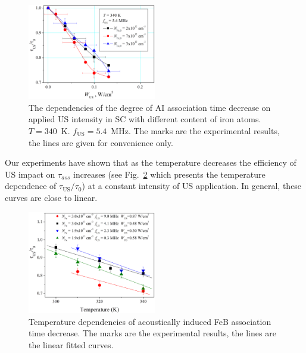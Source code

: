 \begin{figure}
 \includegraphics[width=0.5\textwidth]{Fig5}
\caption{
The dependencies of the degree of AI association time decrease on applied US intensity
in SC with different content of iron atoms.
$T=340$~K.
$f_\mathrm{US}=5.4$~MHz.
The marks are the experimental results, the lines are given for convenience only.
}
\label{figNFe}       %
\end{figure}

Our experiments have shown that
as the temperature decreases the efficiency of US impact on $\tau_{ass}$ increases
(see Fig.~\ref{figTemp} which presents the temperature dependence of $\tau_\mathrm{US}/\tau_{0}$)
at a constant intensity of US application.
In general, these curves are close to linear.

\begin{figure}
 \includegraphics[width=0.5\textwidth]{Fig6}
\caption{
Temperature dependencies of  acoustically induced FeB association time decrease.
The marks are the experimental results, the lines are the linear fitted curves.
}
\label{figTemp}       %
\end{figure}

